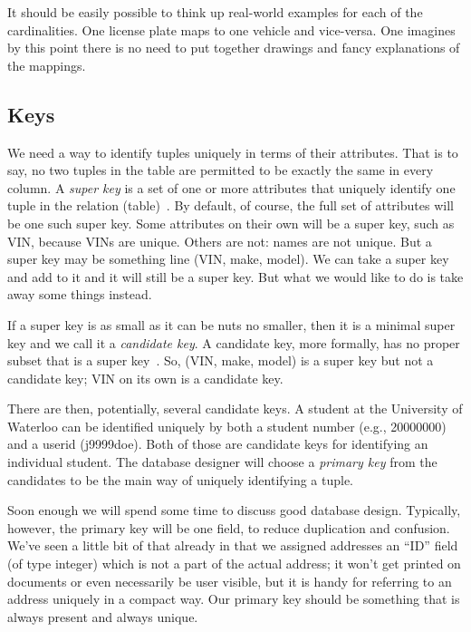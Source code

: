 It should be easily possible to think up real-world examples for each of the cardinalities. One license plate maps to one vehicle and vice-versa. One imagines by this point there is no need to put together drawings and fancy explanations of the mappings.

\subsection*{Keys}

We need a way to identify tuples uniquely in terms of their attributes. That is to say, no two tuples in the table are permitted to be exactly the same in every column. A \textit{super key} is a set of one or more attributes that uniquely identify one tuple in the relation (table)~\cite{dsc}. By default, of course, the full set of attributes will be one such super key. Some attributes on their own will be a super key, such as VIN, because VINs are unique. Others are not: names are not unique. But a super key may be something line (VIN, make, model). We can take a super key and add to it and it will still be a super key. But what we would like to do is take away some things instead.

If a super key is as small as it can be nuts no smaller, then it is a minimal super key and we call it a \textit{candidate key}. A candidate key, more formally, has no proper subset that is a super key~\cite{dsc}. So, (VIN, make, model) is a super key but not a candidate key; VIN on its own is a candidate key.

There are then, potentially, several candidate keys. A student at the University of Waterloo can be identified uniquely by both a student number (e.g., 20000000) and a userid (j9999doe). Both of those are candidate keys for identifying an individual student. The database designer will choose a \textit{primary key} from the candidates to be the main way of uniquely identifying a tuple. 

Soon enough we will spend some time to discuss good database design. Typically, however, the primary key will be one field, to reduce duplication and confusion. We've seen a little bit of that already in that we assigned addresses an ``ID'' field (of type integer) which is not a part of the actual address; it won't get printed on documents or even necessarily be user visible, but it is handy for referring to an address uniquely in a compact way. Our primary key should be something that is always present and always unique.

